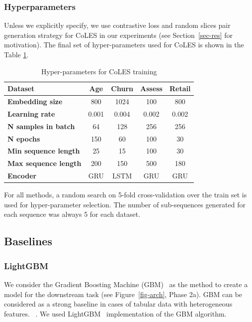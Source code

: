 \documentclass[sigconf, anonymous]{acmart}
\begin{document}
\subsubsection{Hyperparameters}

Unless we explicitly specify, we use contrastive loss and random slices pair generation strategy for CoLES in our experiments (see Section~\ref{sec-res} for motivation). The final set of hyper-parameters used for CoLES is shown in the Table \ref{tab-hyper}.


\begin{table}
\centering
\caption{Hyper-parameters for CoLES training}
\begin{tabularx}{\linewidth}{Xcccc}
\toprule
\textbf{Dataset} & \textbf{Age} & \textbf{Churn} & \textbf{Assess} & \textbf{Retail} \\
\midrule
\textbf{Embedding size} & 800 & 1024 & 100 & 800 \\
\textbf{Learning rate} & 0.001 & 0.004 & 0.002 & 0.002 \\
\textbf{N samples in batch} & 64 & 128 & 256 & 256 \\
\textbf{N epochs} & 150 & 60 & 100 & 30 \\
\textbf{Min sequence length} & 25 & 15 & 100 & 30 \\
\textbf{Max sequence length} & 200 & 150 & 500 & 180 \\
\textbf{Encoder} & GRU & LSTM & GRU & GRU \\
\bottomrule
\end{tabularx}
\small{For all methods, a random search on 5-fold cross-validation over the train set is used for hyper-parameter selection. The number of sub-sequences generated for each sequence was always 5 for each dataset.}
\label{tab-hyper}
\end{table}


\subsection{Baselines} \label{sec-baselines}


\subsubsection{LightGBM}

We consider the Gradient Boosting Machine (GBM)~\citep{Friedman2001GreedyFA} as the method to create a model for the downstream task (see Figure~\ref{fig-arch}, Phase 2a). GBM can be considered as a strong baseline in cases of tabular data with heterogeneous features.
~\citep{Wu2009AdaptingBF, Vorobev2019LearningTS, Zhang2015AGB, Niu2019ACS}. We used LightGBM~\citep{Ke2017LightGBMAH} implementation of the GBM algorithm.
\end{document}
